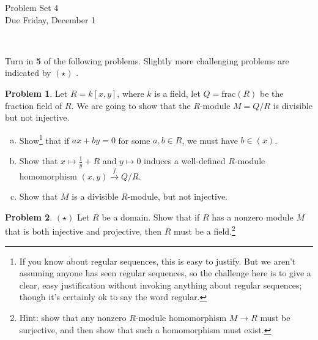 \documentclass[11pt]{article}
\title{}
\date{\vspace{-0.5in}}
\theoremstyle{definition}
\newtheorem{problem}{Problem}
\begin{document}
\thispagestyle{fancy}
\pagestyle{fancy}

\vspace{3em}

\begin{center}
	{\LARGE Problem Set 4}\\
	Due Friday, December 1
\end{center}


\


\noindent
Turn in {\bf 5} of the following problems. Slightly more challenging problems are indicated by $(\star)$ .

%
\noindent

\vspace{2em}




\begin{problem}
	Let $R=k[x,y]$, where $k$ is a field, let $Q = \textrm{frac}(R)$ be the fraction field of $R$. We are going to show that the $R$-module $M = Q/R$ is divisible but not injective.
	\begin{enumerate}[a)]
		\item Show\footnote{If you know about regular sequences, this is easy to justify. But we aren't assuming anyone has seen regular sequences, so the challenge here is to give a clear, easy justification without invoking anything about regular sequences; though it's certainly ok to say the word regular.} that if $ax + by = 0$ for some $a, b \in R$, we must have $b \in (x)$.
		\item Show that $x \mapsto \frac{1}{y} + R$ and $y \mapsto 0$ induces a well-defined $R$-module homomorphism $(x,y) \xrightarrow{\, f \,} Q/R$.
		\item Show that $M$ is a divisible $R$-module, but not injective.
	\end{enumerate}
\end{problem}


\vspace{1em}

\begin{problem}
	$(\star)$ Let $R$ be a domain. Show that if $R$ has a nonzero module $M$ that is both injective and projective, then $R$ must be a field.\footnote{Hint: show that any nonzero $R$-module homomorphism $M \longrightarrow R$ must be surjective, and then show that such a homomorphism must exist.}
\end{problem}
\end{document}
